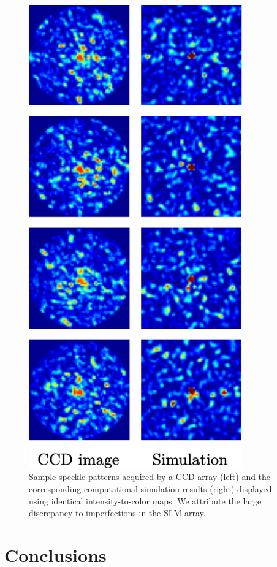 \begin{figure}[h]
\begin{center}
\includegraphics[height=20cm]{figure-ghost-slm-samples.pdf}
\caption{Sample speckle patterns acquired by a CCD array (left) and the corresponding computational simulation results (right) displayed using identical intensity-to-color maps. We attribute the large discrepancy to imperfections in the SLM array.}
\label{figure:ghost-slm-samples}
\end{center}
\end{figure}

\section{Conclusions}

